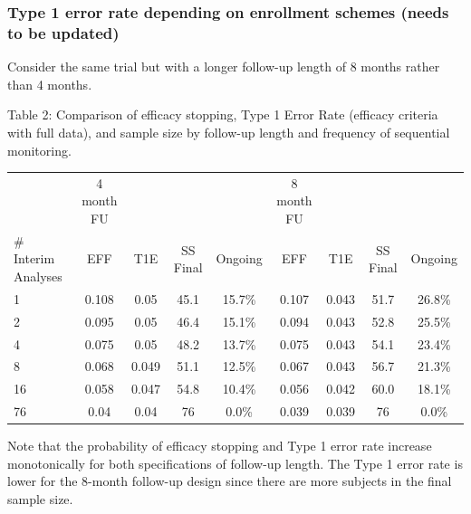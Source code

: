 \documentclass[12pt]{article}
\begin{document}
\newpage
\subsubsection{Type 1 error rate depending on enrollment schemes (needs to be updated)}
Consider the same trial but with a longer follow-up length of 8 months rather than 4 months. 
\begin{center}
Table 2: Comparison of efficacy stopping, Type 1 Error Rate (efficacy criteria with full data), and sample size by follow-up length and frequency of sequential monitoring.
\begin{tabular}{l | cccc|cccc}
	&	4 month FU	&		&		&		&	8 month FU	&		&		&		\\
															
\# Interim Analyses	&	EFF	&	T1E	&	SS Final	&	Ongoing	&	EFF	&	T1E	&	SS Final	&	Ongoing	\\
\hline		
1	&	0.108	&	0.05	&	45.1	&	15.7\%	&	0.107	&	0.043	&	51.7	&	26.8\%	\\
2	&	0.095	&	0.05	&	46.4	&	15.1\%	&	0.094	&	0.043	&	52.8	&	25.5\%	\\
4	&	0.075	&	0.05	&	48.2	&	13.7\%	&	0.075	&	0.043	&	54.1	&	23.4\%	\\
8	&	0.068	&	0.049	&	51.1	&	12.5\%	&	0.067	&	0.043	&	56.7	&	21.3\%	\\
16	&	0.058	&	0.047	&	54.8	&	10.4\%	&	0.056	&	0.042	&	60.0	&	18.1\%	\\
76	&	0.04	&	0.04	&	76	&	0.0\%	&	0.039	&	0.039	&	76	&	0.0\%	
\end{tabular}
\end{center}
Note that the probability of efficacy stopping and Type 1 error rate increase monotonically for both specifications of follow-up length. The Type 1 error rate is lower for the 8-month follow-up design since there are more subjects in the final sample size.

\end{document}

